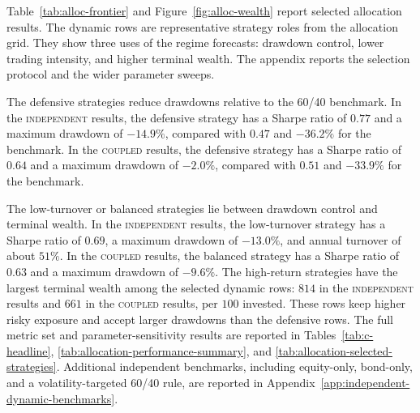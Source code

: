 \documentclass[10pt]{article}
\newcommand{\Acoup}{\textsc{coupled}}
\newcommand{\Bindep}{\textsc{independent}}
\begin{document}
Table~\ref{tab:alloc-frontier} and Figure~\ref{fig:alloc-wealth} report selected allocation
results. The dynamic rows are representative strategy roles from the allocation grid. They
show three uses of the regime forecasts: drawdown control, lower trading intensity, and
higher terminal wealth. The appendix reports the selection protocol and the wider parameter
sweeps.

The defensive strategies reduce drawdowns relative to the 60/40 benchmark. In the \Bindep{}
results, the defensive strategy has a Sharpe ratio of \(0.77\) and a maximum drawdown of
\(-14.9\%\), compared with \(0.47\) and \(-36.2\%\) for the benchmark. In the \Acoup{}
results, the defensive strategy has a Sharpe ratio of \(0.64\) and a maximum drawdown of
\(-2.0\%\), compared with \(0.51\) and \(-33.9\%\) for the benchmark.

The low-turnover or balanced strategies lie between drawdown control and terminal wealth. In
the \Bindep{} results, the low-turnover strategy has a Sharpe ratio of \(0.69\), a maximum
drawdown of \(-13.0\%\), and annual turnover of about \(51\%\). In the \Acoup{} results, the
balanced strategy has a Sharpe ratio of \(0.63\) and a maximum drawdown of \(-9.6\%\). The
high-return strategies have the largest terminal wealth among the selected dynamic rows:
\(814\) in the \Bindep{} results and \(661\) in the \Acoup{} results, per \(100\) invested.
These rows keep higher risky exposure and accept larger drawdowns than the defensive rows.
The full metric set and parameter-sensitivity results are reported in Tables~\ref{tab:c-headline},
\ref{tab:allocation-performance-summary}, and \ref{tab:allocation-selected-strategies}.
Additional independent benchmarks, including equity-only, bond-only, and a
volatility-targeted 60/40 rule, are reported in Appendix~\ref{app:independent-dynamic-benchmarks}.
\end{document}
